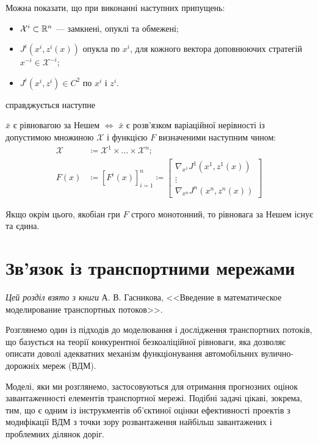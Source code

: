 Можна показати, що при виконанні наступних припущень:
\begin{itemize}
    \item $\mathcal{X}^i \subset \mathbb{R}^n$ --- замкнені, опуклі та обмежені;
    \item $J^i(x^i, z^i(x))$ опукла по $x^i$, для кожного вектора доповнюючих стратегій $x^{-i} \in \mathcal{X}^{-i}$;
    \item $J^i(x^i, z^i) \in C^2$ по $x^i$ і $z^i$.
\end{itemize}
справджується наступне
\begin{proposition}
    $\bar x$ є рівновагою за Нешем $\iff$ $\bar x$ є розв'язком варіаційної нерівності із допустимою множиною $\mathcal{X}$ і функцією $F$ визначеними наступним чином:
    \begin{align}
        \mathcal{X} &\coloneqq \mathcal{X}^1 \times \dots \times \mathcal{X}^n; \\
        F(x) &\coloneqq [F^i(x)]_{i = 1}^n \coloneqq \begin{bmatrix}
            \nabla_{x^1} J^1(x^1, z^1(x)) \\
            \vdots \\
            \nabla_{x^n} J^n(x^n, z^n(x)) 
        \end{bmatrix}
    \end{align}
\end{proposition}

\begin{proposition}
    Якщо окрім цього, якобіан гри $F$ строго монотонний, то рівновага за Нешем існує та єдина.
\end{proposition}

\section{Зв'язок із транспортними мережами}

\emph{Цей розділ взято з книги} А. В. Гасникова, <<Введение в математическое моделирование транспортных потоков>>. \medskip

Розглянемо один із підходів до моделювання і дослідження транспортних потоків, що базується на теорії конкурентної безкоаліційної рівноваги, яка дозволяє описати доволі адекватних механізм функціонування автомобільних вулично-дорожніх мереж (ВДМ). \medskip

Моделі, яки ми розглянемо, застосовуються для отримання прогнозних оцінок завантаженності елементів транспортної мережі. Подібні задачі цікаві, зокрема, тим, що є одним із інструкментів об'єктиної оцінки ефективності проектів з модифікації ВДМ з точки зору розвантаження найбільш завантажених і проблемних ділянок доріг.

